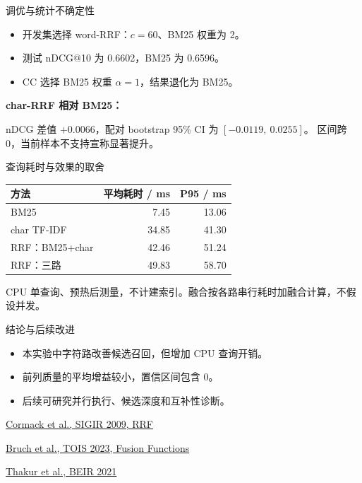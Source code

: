 \documentclass[aspectratio=169,11pt]{beamer}
\begin{document}
\begin{frame}{调优与统计不确定性}
\begin{itemize}\setlength\itemsep{0.65em}
\item 开发集选择 word-RRF：$c=60$、BM25 权重为 2。
\item 测试 nDCG@10 为 0.6602，BM25 为 0.6596。
\item CC 选择 BM25 权重 $\alpha=1$，结果退化为 BM25。
\end{itemize}
\medskip
\textbf{char-RRF 相对 BM25：}\par
nDCG 差值 $+0.0066$，配对 bootstrap 95\% CI 为 $[-0.0119,\ 0.0255]$。
\vfill
区间跨 0，当前样本不支持宣称显著提升。
\end{frame}

\begin{frame}{查询耗时与效果的取舍}
\centering
\renewcommand\arraystretch{1.35}
\begin{tabular}{lrr}\toprule
方法 & 平均耗时 / ms & P95 / ms\\\midrule
BM25 & 7.45 & 13.06\\
char TF-IDF & 34.85 & 41.30\\
RRF：BM25+char & 42.46 & 51.24\\
RRF：三路 & 49.83 & 58.70\\\bottomrule
\end{tabular}
\vfill
\raggedright
CPU 单查询、预热后测量，不计建索引。融合按各路串行耗时加融合计算，不假设并发。
\end{frame}

\begin{frame}{结论与后续改进}
\begin{itemize}\setlength\itemsep{0.6em}
\item 本实验中字符路改善候选召回，但增加 CPU 查询开销。
\item 前列质量的平均增益较小，置信区间包含 0。
\item 后续可研究并行执行、候选深度和互补性诊断。
\end{itemize}
\vfill\footnotesize
\href{https://doi.org/10.1145/1571941.1572114}{Cormack et al., SIGIR 2009, RRF}\par\smallskip
\href{https://arxiv.org/abs/2210.11934}{Bruch et al., TOIS 2023, Fusion Functions}\par\smallskip
\href{https://arxiv.org/abs/2104.08663}{Thakur et al., BEIR 2021}
\end{frame}
\end{document}
